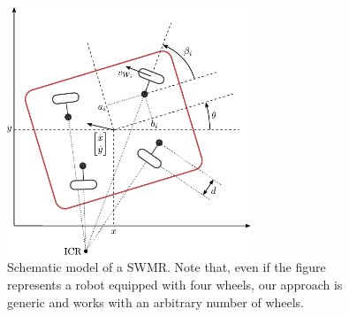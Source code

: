 \begin{figure}
    \centering
    \includegraphics[width=0.65\textwidth]{figures/SWMR/swmr.pdf}
    \caption{Schematic model of a SWMR. Note that, even if the figure represents a robot equipped with four wheels, our approach is generic and works with an arbitrary number of wheels.}
    \label{fig:swmr}
\end{figure}

